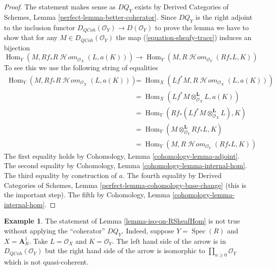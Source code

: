 \documentclass{stacks-project}
\theoremstyle{plain}
\theoremstyle{definition}
\newtheorem{example}[subsection]{Example}
\theoremstyle{remark}
\numberwithin{equation}{subsection}
\def\Spec{\mathop{\mathrm{Spec}}}
\def\Hom{\mathop{\mathrm{Hom}}\nolimits}
\def\SheafHom{\mathop{\mathcal{H}\!\mathit{om}}\nolimits}
\def\QCoh{\mathit{QCoh}}
\begin{document}
\begin{proof}
The statement makes sense as $DQ_Y$ exists by
Derived Categories of Schemes, Lemma \ref{perfect-lemma-better-coherator}.
Since $DQ_Y$ is the right adjoint to the inclusion
functor $D_\QCoh(\mathcal{O}_Y) \to D(\mathcal{O}_Y)$
to prove the lemma we have to show that for any $M \in D_\QCoh(\mathcal{O}_Y)$
the map (\ref{equation-sheafy-trace}) induces an bijection
$$
\Hom_Y(M, Rf_*R\SheafHom_{\mathcal{O}_X}(L, a(K)))
\longrightarrow
\Hom_Y(M, R\SheafHom_{\mathcal{O}_Y}(Rf_*L, K))
$$
To see this we use the following string of equalities
\begin{align*}
\Hom_Y(M, Rf_*R\SheafHom_{\mathcal{O}_X}(L, a(K)))
& =
\Hom_X(Lf^*M, R\SheafHom_{\mathcal{O}_X}(L, a(K))) \\
& =
\Hom_X(Lf^*M \otimes_{\mathcal{O}_X}^\mathbf{L} L, a(K)) \\
& =
\Hom_Y(Rf_*(Lf^*M \otimes_{\mathcal{O}_X}^\mathbf{L} L), K) \\
& =
\Hom_Y(M \otimes_{\mathcal{O}_Y}^\mathbf{L} Rf_*L, K) \\
& =
\Hom_Y(M, R\SheafHom_{\mathcal{O}_Y}(Rf_*L, K))
\end{align*}
The first equality holds by Cohomology, Lemma \ref{cohomology-lemma-adjoint}.
The second equality by Cohomology, Lemma \ref{cohomology-lemma-internal-hom}.
The third equality by construction of $a$.
The fourth equality by Derived Categories of Schemes, Lemma
\ref{perfect-lemma-cohomology-base-change} (this is the important step).
The fifth by Cohomology, Lemma \ref{cohomology-lemma-internal-hom}.
\end{proof}

\begin{example}
\label{example-iso-on-RSheafHom}
The statement of Lemma \ref{lemma-iso-on-RSheafHom} is not true without
applying the ``coherator'' $DQ_Y$. Indeed, suppose $Y = \Spec(R)$ and
$X = \mathbf{A}^1_R$. Take $L = \mathcal{O}_X$ and $K = \mathcal{O}_Y$.
The left hand side of the arrow is in $D_\QCoh(\mathcal{O}_Y)$ but
the right hand side of the arrow is isomorphic to
$\prod_{n \geq 0} \mathcal{O}_Y$ which is not quasi-coherent.
\end{example}
\end{document}
